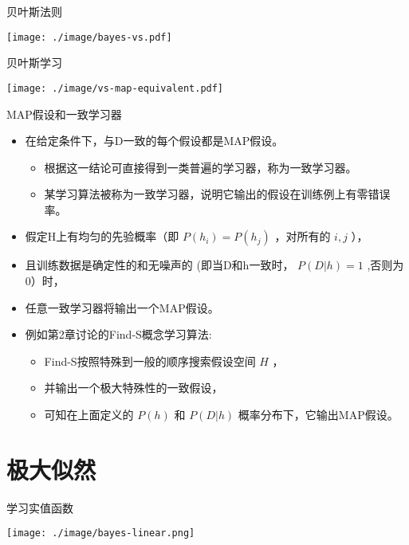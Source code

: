 \documentclass[presentation]{beamer}
\begin{document}
\begin{frame}[label={sec:org3a5bd32}]{贝叶斯法则}
\begin{center}
\texttt{[image: ./image/bayes-vs.pdf]}
\end{center}
\end{frame}

\begin{frame}[label={sec:org58b7158}]{贝叶斯学习}
\begin{center}
\texttt{[image: ./image/vs-map-equivalent.pdf]}
\end{center}
\end{frame}

\begin{frame}[label={sec:org96ac4ab}]{MAP假设和一致学习器}
\begin{itemize}
\item 在给定条件下，与D一致的每个假设都是MAP假设。
\begin{itemize}
\item 根据这一结论可直接得到一类普遍的学习器，称为一致学习器。
\item 某学习算法被称为一致学习器，说明它输出的假设在训练例上有零错误率。
\end{itemize}

\item 假定H上有均匀的先验概率（即 \(P(h_i)=P(h_j)\) ，对所有的 \(i,j\) ），
\item 且训练数据是确定性的和无噪声的 (即当D和h一致时， \(P(D|h)=1\) ,否则为0）时，
\item 任意一致学习器将输出一个MAP假设。

\item 例如第2章讨论的Find-S概念学习算法:
\begin{itemize}
\item Find-S按照特殊到一般的顺序搜索假设空间 \(H\) ，
\item 并输出一个极大特殊性的一致假设，
\item 可知在上面定义的 \(P(h)\) 和 \(P(D|h)\) 概率分布下，它输出MAP假设。
\end{itemize}
\end{itemize}
\end{frame}

\section{极大似然}
\label{sec:org52166e9}
\begin{frame}[label={sec:org326813b}]{学习实值函数}
\begin{center}
\texttt{[image: ./image/bayes-linear.png]}
\end{center}
\end{frame}
\end{document}
